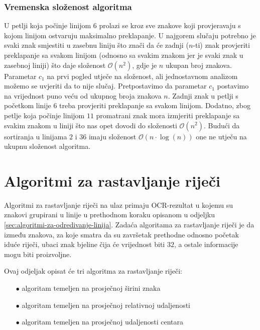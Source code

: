 \documentclass[times, utf8, zavrsni]{fer}
\begin{document}
\subsubsection{Vremenska složenost algoritma}
U petlji koja počinje linijom $6$ prolazi se kroz sve znakove koji provjeravaju
s kojom linijom ostvaruju maksimalno preklapanje. U najgorem slučaju potrebno je
svaki znak smjestiti u zasebnu liniju što znači da će zadnji ($n$-ti) znak
provjeriti preklapanje sa svakom linijom (odnosno sa svakim znakom jer je svaki
znak u zasebnoj liniji) što daje složenost $\mathcal{O}(n^2)$, gdje je $n$
ukupan broj znakova. Parametar $c_1$ na prvi pogled utječe na složenost, ali
jednostavnom analizom možemo se uvjeriti da to nije slučaj. Pretpostavimo da
parametar $c_1$ postavimo na vrijednost puno veću od ukupnog broja znakova $n$.
Zadnji znak u petlji s početkom linije $6$ treba provjeriti preklapanje sa
svakom linijom. Dodatno, zbog petlje koja počinje linijom $11$ promatrani znak
mora izmjeriti preklapanje sa svakim znakom u liniji što nas opet dovodi do
složenosti $\mathcal{O}(n^2)$. Budući da sortiranja u linijama $2$ i $36$ imaju
složenost $\mathcal{O}(n \cdot \log(n))$ one ne utječu na ukupnu složenost
algoritma.








\section{Algoritmi za rastavljanje riječi}
\label{sec:algoritmi-za-rastavljanje-riječi}
Algoritmi za rastavljanje riječi na ulaz primaju OCR-rezultat u kojemu su
znakovi grupirani u linije u prethodnom koraku opisanom u odjeljku
\ref{sec:algoritmi-za-odredivanje-linija}. Zadaća algoritama za rastavljanje
riječi je da između znakova, za koje smatra da su završetak prethodne odnosno
početak iduće riječi, ubaci znak bjeline čija će vrijednost  biti
$32$, a ostale informacije mogu biti proizvoljne.

Ovaj odjeljak opisat će tri algoritma za rastavljanje riječi:
\begin{itemize}
    \item[$\bullet$] algoritam temeljen na prosječnoj širini znaka
    \item[$\bullet$] algoritam temeljen na prosječnoj relativnoj
                     udaljenosti
    \item[$\bullet$] algoritam temeljen na prosječnoj udaljenosti centara
\end{itemize}
\end{document}
